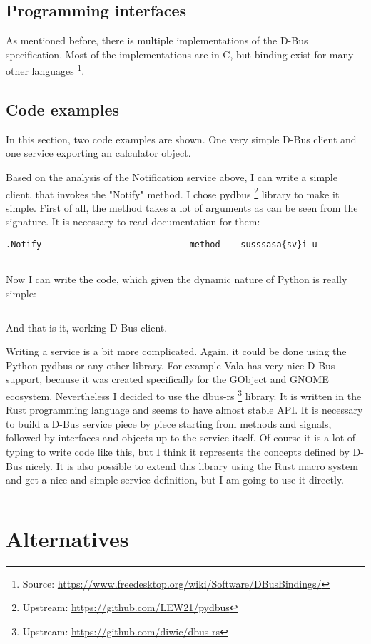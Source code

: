 \documentclass[a4paper,10.5pt]{article}
\begin{document}
\subsection{Programming interfaces}

As mentioned before, there is multiple implementations of the D-Bus specification. Most of the implementations are in C, but binding exist for many other languages \footnote{Source: \url{https://www.freedesktop.org/wiki/Software/DBusBindings/}}.

\subsection{Code examples}

In this section, two code examples are shown. One very simple D-Bus client and one service exporting an calculator object.

Based on the analysis of the Notification service above, I can write a simple client, that invokes the "Notify" method. I chose pydbus \footnote{Upstream: \url{https://github.com/LEW21/pydbus}} library to make it simple. First of all, the method takes a lot of arguments as can be seen from the signature. It is necessary to read documentation for them:
\begin{verbatim}
.Notify                             method    susssasa{sv}i u            -
\end{verbatim}
Now I can write the code, which given the dynamic nature of Python is really simple:
\inputminted{python}{client/dbus.py}
And that is it, working D-Bus client.

Writing a service is a bit more complicated. Again, it could be done using the Python pydbus or any other library. For example Vala has very nice D-Bus support, because it was created specifically for the GObject and GNOME ecosystem. Nevertheless I decided to use the dbus-rs \footnote{Upstream: \url{https://github.com/diwic/dbus-rs}} library. It is written in the Rust programming language and seems to have almost stable API. It is necessary to build a D-Bus service piece by piece starting from methods and signals, followed by interfaces and objects up to the service itself. Of course it is a lot of typing to write code like this, but I think it represents the concepts defined by D-Bus nicely. It is also possible to extend this library using the Rust macro system and get a nice and simple service definition, but I am going to use it directly.
\inputminted{rust}{service/src/main.rs}

\section{Alternatives}
\end{document}
